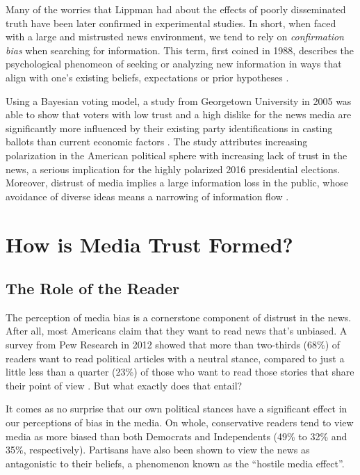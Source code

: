 Many of the worries that Lippman had about the effects of poorly disseminated truth have been later confirmed in experimental studies. In short, when faced with a large and mistrusted news environment, we tend to rely on \emph{confirmation bias} when searching for information. This term, first coined in 1988, describes the psychological phenomeon of seeking or analyzing new information in ways that align with one's existing beliefs, expectations or prior hypotheses \cite{nickerson1998confirmation}.

Using a Bayesian voting model, a study from Georgetown University in 2005 was able to show that voters with low trust and a high dislike for the news media are significantly more influenced by their existing party identifications in casting ballots than current economic factors \cite{ladd2005attitudes}. The study attributes increasing polarization in the American political sphere with increasing lack of trust in the news, a serious implication for the highly polarized 2016 presidential elections. Moreover, distrust of media implies a large information loss in the public, whose avoidance of diverse ideas means a narrowing of information flow \cite{ladd2011americans}.  

\section{How is Media Trust Formed?}
\subsection{The Role of the Reader}

The perception of media bias is a cornerstone component of distrust in the news. 
After all, most Americans claim that they want to read news that's unbiased. A survey from Pew Research in 2012 showed that more than two-thirds (68\%) of readers want to read political articles with a neutral stance, compared to just a little less than a quarter (23\%) of those who want to read those stories that share their point of view \cite{Pew-bias-2012}. But what exactly does that entail?

It comes as no surprise that our own political stances have a significant effect in our perceptions of bias in the media. On whole, conservative readers tend to view media as more biased than both Democrats and Independents (49\% to 32\% and 35\%, respectively)\cite{Pew-bias-2012}. Partisans have also been shown to view the news as antagonistic to their beliefs, a phenomenon known as the ``hostile media effect''.

